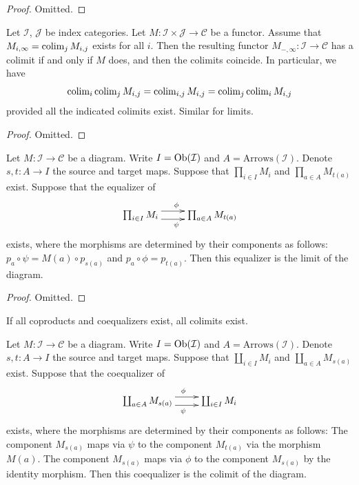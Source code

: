 \begin{proof}
Omitted.
\end{proof}


\begin{lemma}
\label{lemma-colimits-commute}
Let $\mathcal{I}$, $\mathcal{J}$ be index categories. Let
$M : \mathcal{I} \times \mathcal{J} \to \mathcal{C}$ be a functor.
Assume that $M_{i, \infty} = \mathop{\mathrm{colim}}\nolimits_j M_{i,j}$ 
exists for all $i$. Then the resulting functor
$M_{-, \infty} : \mathcal{I} \to \mathcal{C}$
has a colimit if and only if $M$ does, and then the colimits coincide.
In particular, we have
$$
\mathop{\mathrm{colim}}\nolimits_i \mathop{\mathrm{colim}}\nolimits_j M_{i, j}
=
\mathop{\mathrm{colim}}\nolimits_{i, j} M_{i, j}
=
\mathop{\mathrm{colim}}\nolimits_j \mathop{\mathrm{colim}}\nolimits_i M_{i, j}
$$
provided all the indicated colimits exist. Similar for limits.
\end{lemma}

\begin{proof}
Omitted.
\end{proof}

\begin{lemma}
\label{lemma-limits-products-equalizers}
Let $M : \mathcal{I} \to \mathcal{C}$ be a diagram.
Write $I = \mathop{\mathrm{Ob}}\nolimits(\mathcal{I})$ and $A = \text{Arrows}(\mathcal{I})$.
Denote $s, t : A \to I$ the source and target maps.
Suppose that $\prod_{i \in I} M_i$ and $\prod_{a \in A} M_{t(a)}$
exist. Suppose that the equalizer of
$$
\xymatrix{
\prod_{i \in I} M_i
\ar@<1ex>[r]^\phi \ar@<-1ex>[r]_\psi
&
\prod_{a \in A} M_{t(a)}
}
$$
exists, where the morphisms are determined by their components
as follows: $p_a \circ \psi = M(a) \circ p_{s(a)}$
and $p_a \circ \phi = p_{t(a)}$. Then this equalizer is the
limit of the diagram.
\end{lemma}

\begin{proof}
Omitted.
\end{proof}


\begin{lemma}
\label{lemma-colimits-coproducts-coequalizers}
\begin{slogan}
If all coproducts and coequalizers exist, all colimits exist.
\end{slogan}
Let $M : \mathcal{I} \to \mathcal{C}$ be a diagram.
Write $I = \mathop{\mathrm{Ob}}\nolimits(\mathcal{I})$ and $A = \text{Arrows}(\mathcal{I})$.
Denote $s, t : A \to I$ the source and target maps.
Suppose that $\coprod_{i \in I} M_i$ and $\coprod_{a \in A} M_{s(a)}$
exist. Suppose that the coequalizer of
$$
\xymatrix{
\coprod_{a \in A} M_{s(a)}
\ar@<1ex>[r]^\phi \ar@<-1ex>[r]_\psi
&
\coprod_{i \in I} M_i
}
$$
exists, where the morphisms are determined by their components
as follows: The component $M_{s(a)}$ maps via $\psi$
to the component $M_{t(a)}$ via the morphism $M(a)$.
The component $M_{s(a)}$ maps via $\phi$ to the component
$M_{s(a)}$ by the identity morphism. Then this coequalizer is the
colimit of the diagram.
\end{lemma}

